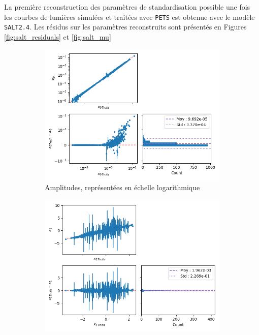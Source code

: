 \documentclass{book}
\def\pets{\texttt{PETS}\xspace}
\def\saltd{\texttt{SALT2.4}\xspace}
\begin{document}
La première reconstruction des paramètres de standardisation possible une fois les courbes de lumières simulées et traitées avec \pets est obtenue avec le modèle \saltd. Les résidus sur les paramètres reconstruits sont présentés en Figures \ref{fig:salt_residuals} et \ref{fig:salt_mu}

\begin{figure}
	\centering
	\begin{subfigure}{0.45\textwidth}
		\centering
		\includegraphics[width=\textwidth]{figures/salt_x0.png}
		\caption{Amplitudes, représentées en échelle logarithmique}
		\label{fig:salt_x0}
	\end{subfigure}
	\hfill
	\begin{subfigure}{0.45\textwidth}
		\centering
		\includegraphics[width=\textwidth]{figures/salt_x1.png}

\end{subfigure}
\end{figure}
\end{document}

